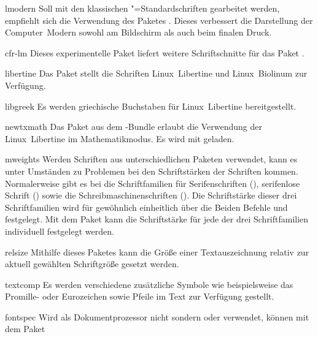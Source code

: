 \begin{packages}
\item[lmodern]
  Soll mit den klassischen "=Standardschriften gearbeitet werden, 
  empfiehlt sich die Verwendung des Paketes . Dieses 
  verbessert die Darstellung der Computer~Modern sowohl am Bildschirm als auch 
  beim finalen Druck.
\item[cfr-lm]
  Dieses experimentelle Paket liefert weitere Schriftschnitte für das Paket 
  .
\item[libertine]
  Das Paket stellt die Schriften Linux~Libertine und Linux~Biolinum zur 
  Verfügung.
  \begin{packages}
    \item[libgreek]
      Es werden griechische Buchstaben für Linux~Libertine bereitgestellt.
    \item[newtxmath]
      Das Paket aus dem -Bundle erlaubt die Verwendung der 
      Linux~Libertine im Mathematikmodus. Es wird mit
       geladen.
  \end{packages}
\item[mweights]
  Werden Schriften aus unterschiedlichen Paketen verwendet, kann es unter 
  Umständen zu Problemen bei den Schriftstärken der Schriften kommen. 
  Normalerweise gibt es bei  die Schriftfamilien für 
  Serifenschriften (), serifenlose Schrift () 
  sowie die Schreibmaschinenschriften (). Die Schriftstärke 
  dieser drei Schriftfamilien wird für gewöhnlich einheitlich über die Beiden 
  Befehle  und  festgelegt. Mit dem Paket 
   kann die Schriftstärke für jede der drei Schriftfamilien 
  individuell festgelegt werden.
\item[relsize]
  Mithilfe dieses Paketes kann die Größe einer Textauszeichnung relativ zur 
  aktuell gewählten Schriftgröße gesetzt werden.
\item[textcomp]
  Es werden verschiedene zusätzliche Symbole wie beispielsweise das Promille- 
  oder Eurozeichen sowie Pfeile im Text zur Verfügung gestellt.
\item[fontspec]
  Wird als Dokumentprozessor nicht  sondern  
  oder  verwendet, können mit dem Paket  

\end{packages}
